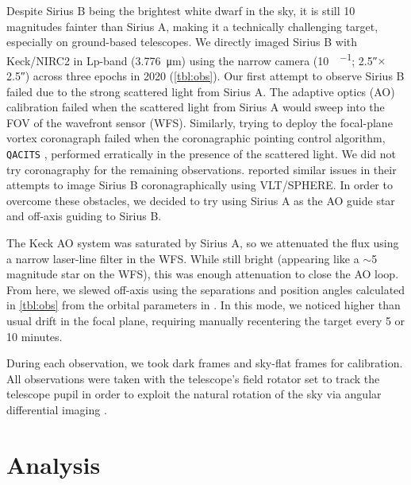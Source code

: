 \documentclass[twocolumn,linenumbers]{aastex631}
\begin{document}
Despite Sirius B being the brightest white dwarf in the sky, it is still 10 magnitudes fainter than Sirius A, making it a technically challenging target, especially on ground-based telescopes. We directly imaged Sirius B with Keck/NIRC2 in Lp-band (\qty{3.776}{\micro\meter}) using the narrow camera (\qty{10}{\milliarcsecond\per\pixel}; \ang{;;2.5}$\times$\ang{;;2.5}) across three epochs in 2020 (\cref{tbl:obs}). Our first attempt to observe Sirius B failed due to the strong scattered light from Sirius A. The adaptive optics (AO) calibration failed when the scattered light from Sirius A would sweep into the FOV of the wavefront sensor (WFS). Similarly, trying to deploy the focal-plane vortex coronagraph \citep{serabynKeckObservatoryInfrared2017} failed when the coronagraphic pointing control algorithm, \texttt{QACITS} \citep{hubyOnskyPerformanceQACITS2017a}, performed erratically in the presence of the scattered light. We did not try coronagraphy for the remaining observations. \citet[\S2]{viganHighcontrastImagingSirius2015} reported similar issues in their attempts to image Sirius B coronagraphically using VLT/SPHERE. In order to overcome these obstacles, we decided to try using Sirius A as the AO guide star and off-axis guiding to Sirius B.

The Keck AO system \citep{wizinowichPerformanceKeckObservatory2000} was saturated by Sirius A, so we attenuated the flux using a narrow laser-line filter in the WFS. While still bright (appearing like a $\sim$5 magnitude star on the WFS), this was enough attenuation to close the AO loop. From here, we slewed off-axis using the separations and position angles calculated in \cref{tbl:obs} from the orbital parameters in \citet{bondSiriusSystemIts2017}. In this mode, we noticed higher than usual drift in the focal plane, requiring manually recentering the target every 5 or 10 minutes.

During each observation, we took dark frames and sky-flat frames for calibration. All observations were taken with the telescope's field rotator set to track the telescope pupil in order to exploit the natural rotation of the sky via angular differential imaging \citep[ADI;][]{maroisAngularDifferentialImaging2006}.

\section{Analysis} \label{sec:analysis}

\begin{figure*}
    \centering
    \caption{The contrast curves for the best performing algorithm from each epoch. The solid lines are the Gaussian 5$\sigma$ contrast curves and the dashed lines are the Student-t corrected curves. The expected upper limit for a dynamically stable orbit of \qty{1.5}{\au} is plotted as a vertical dashed line. The annular PCA curve is cut off because the innermost annulus has a contrast value greater than 1, which means even a 100 S/N companion would not be detectable with 5$\sigma$ significance.}
    \label{fig:contrast}
\end{figure*}
\end{document}
